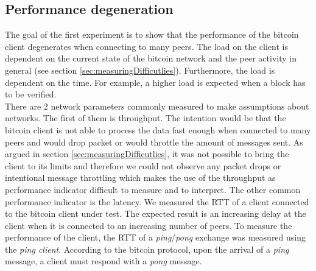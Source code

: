 \subsection{Performance degeneration \label{sec:perf_degen}}
The goal of the first experiment is to show that the performance of the bitcoin client degenerates when connecting to many peers. The load on the client is dependent on the current state of the bitcoin network and the peer activity in general (see section \ref{sec:measuringDifficutlies}). Furthermore, the load is dependent on the time. For example, a higher load is expected when a block has to be verified.\\ 
There are 2 network parameters commonly measured to make assumptions about networks. The first of them is throughput. The intention would be that the bitcoin client is not able to process the data fast enough when connected to many peers and would drop packet or would throttle the amount of messages sent. As argued in section \ref{sec:measuringDifficutlies}, it was not possible to bring the client to its limits and therefore we could not observe any packet drops or intentional message throttling which makes the use of the throughput as performance indicator difficult to measure and to interpret. The other common performance indicator is the latency. We measured the RTT of a client connected to the bitcoin client under test. The expected result is an increasing delay at the client when it is connected to an increasing number of peers. To measure the performance of the client, the RTT of a \textit{ping}/\textit{pong} exchange was measured using the \textit{ping client}. According to the bitcoin protocol, upon the arrival of a \textit{ping} message, a client must respond with a \textit{pong} message\cite{bitcoinNetworkProtocol}. 
